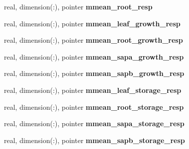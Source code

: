 \begin{DoxyCompactItemize}
\item 
\hypertarget{structed__state__vars_1_1patchtype_afa1c4f685b614432a1d7417c5340f8c6}{
real, dimension(:), pointer {\bfseries mmean\_\-root\_\-resp}}
\label{structed__state__vars_1_1patchtype_afa1c4f685b614432a1d7417c5340f8c6}

\item 
\hypertarget{structed__state__vars_1_1patchtype_a82d70a7a740ea32e12d4a0ca01c450ae}{
real, dimension(:), pointer {\bfseries mmean\_\-leaf\_\-growth\_\-resp}}
\label{structed__state__vars_1_1patchtype_a82d70a7a740ea32e12d4a0ca01c450ae}

\item 
\hypertarget{structed__state__vars_1_1patchtype_a4b70628a0cdcb790745e1474670597ee}{
real, dimension(:), pointer {\bfseries mmean\_\-root\_\-growth\_\-resp}}
\label{structed__state__vars_1_1patchtype_a4b70628a0cdcb790745e1474670597ee}

\item 
\hypertarget{structed__state__vars_1_1patchtype_a4d02cef2c8afc1c6a00365ea9f3a49bb}{
real, dimension(:), pointer {\bfseries mmean\_\-sapa\_\-growth\_\-resp}}
\label{structed__state__vars_1_1patchtype_a4d02cef2c8afc1c6a00365ea9f3a49bb}

\item 
\hypertarget{structed__state__vars_1_1patchtype_a3e3238db3a3adc0a6202fb1656fc6521}{
real, dimension(:), pointer {\bfseries mmean\_\-sapb\_\-growth\_\-resp}}
\label{structed__state__vars_1_1patchtype_a3e3238db3a3adc0a6202fb1656fc6521}

\item 
\hypertarget{structed__state__vars_1_1patchtype_a0b8469bf4471bc30deea3b8a6c4daa49}{
real, dimension(:), pointer {\bfseries mmean\_\-leaf\_\-storage\_\-resp}}
\label{structed__state__vars_1_1patchtype_a0b8469bf4471bc30deea3b8a6c4daa49}

\item 
\hypertarget{structed__state__vars_1_1patchtype_aa1dfa6a394acae48a3f65407bad5394c}{
real, dimension(:), pointer {\bfseries mmean\_\-root\_\-storage\_\-resp}}
\label{structed__state__vars_1_1patchtype_aa1dfa6a394acae48a3f65407bad5394c}

\item 
\hypertarget{structed__state__vars_1_1patchtype_a1ec5e0a90385dcda53f65eecbfa437a7}{
real, dimension(:), pointer {\bfseries mmean\_\-sapa\_\-storage\_\-resp}}
\label{structed__state__vars_1_1patchtype_a1ec5e0a90385dcda53f65eecbfa437a7}

\item 
\hypertarget{structed__state__vars_1_1patchtype_a39cb17379be410dba3255dd0427f0b12}{
real, dimension(:), pointer {\bfseries mmean\_\-sapb\_\-storage\_\-resp}}
\label{structed__state__vars_1_1patchtype_a39cb17379be410dba3255dd0427f0b12}


\end{DoxyCompactItemize}
